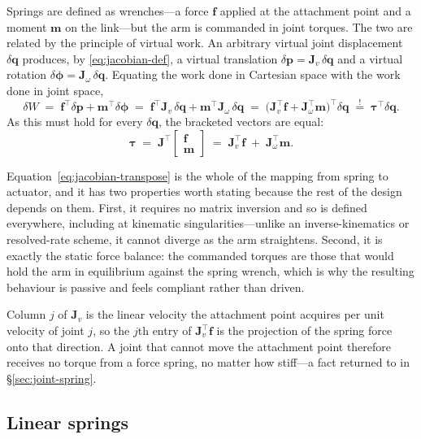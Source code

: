 Springs are defined as wrenches---a force $\bm{f}$ applied at the attachment
point and a moment $\bm{m}$ on the link---but the arm is commanded in joint
torques. The two are related by the principle of virtual work. An arbitrary
virtual joint displacement $\delta\bm{q}$ produces, by
\eqref{eq:jacobian-def}, a virtual translation
$\delta\bm{p} = \bm{J}_{v}\,\delta\bm{q}$ and a virtual rotation
$\delta\bm{\phi} = \bm{J}_{\omega}\,\delta\bm{q}$. Equating the work done in
Cartesian space with the work done in joint space,
%
\begin{equation}
  \delta W
  \;=\; \bm{f}^{\top}\delta\bm{p} + \bm{m}^{\top}\delta\bm{\phi}
  \;=\; \bm{f}^{\top}\bm{J}_{v}\,\delta\bm{q}
      + \bm{m}^{\top}\bm{J}_{\omega}\,\delta\bm{q}
  \;=\; \bigl(\bm{J}_{v}^{\top}\bm{f}
      + \bm{J}_{\omega}^{\top}\bm{m}\bigr)^{\!\top}\delta\bm{q}
  \;\stackrel{!}{=}\; \bm{\tau}^{\top}\delta\bm{q}.
\end{equation}
%
As this must hold for every $\delta\bm{q}$, the bracketed vectors are equal:
%
\begin{equation}
  \boxed{\;\bm{\tau} \;=\; \bm{J}^{\top}
  \begin{bmatrix}\bm{f}\\\bm{m}\end{bmatrix}
  \;=\; \bm{J}_{v}^{\top}\bm{f} \;+\; \bm{J}_{\omega}^{\top}\bm{m}.\;}
  \label{eq:jacobian-transpose}
\end{equation}

Equation~\eqref{eq:jacobian-transpose} is the whole of the mapping from spring
to actuator, and it has two properties worth stating because the rest of the
design depends on them. First, it requires no matrix inversion and so is
defined everywhere, including at kinematic singularities---unlike an
inverse-kinematics or resolved-rate scheme, it cannot diverge as the arm
straightens. Second, it is exactly the static force balance: the commanded
torques are those that would hold the arm in equilibrium against the spring
wrench, which is why the resulting behaviour is passive and feels compliant
rather than driven.

Column $j$ of $\bm{J}_{v}$ is the linear velocity the attachment point acquires
per unit velocity of joint $j$, so the $j$th entry of
$\bm{J}_{v}^{\top}\bm{f}$ is the projection of the spring force onto that
direction. A joint that cannot move the attachment point therefore receives no
torque from a force spring, no matter how stiff---a fact returned to in
\S\ref{sec:joint-spring}.

\subsection{Linear springs}
\label{sec:linear-spring}

